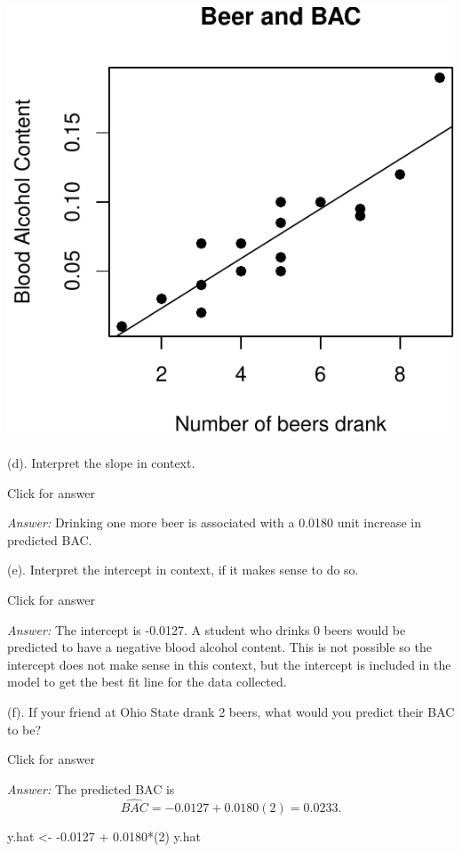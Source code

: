 \documentclass[
]{book}
\newenvironment{Shaded}{\begin{snugshade}}{\end{snugshade}}
\newcommand{\DecValTok}[1]{\textcolor[rgb]{0.00,0.00,0.81}{#1}}
\newcommand{\FloatTok}[1]{\textcolor[rgb]{0.00,0.00,0.81}{#1}}
\newcommand{\NormalTok}[1]{#1}
\newcommand{\OtherTok}[1]{\textcolor[rgb]{0.56,0.35,0.01}{#1}}
\newcommand{\SpecialCharTok}[1]{\textcolor[rgb]{0.00,0.00,0.00}{#1}}
\begin{document}
\includegraphics[width=1\linewidth]{Class_Activity_6_files/figure-latex/unnamed-chunk-6-1}

(d). Interpret the slope in context.

Click for answer

\emph{Answer:} Drinking one more beer is associated with a 0.0180 unit increase in predicted BAC.

(e). Interpret the intercept in context, if it makes sense to do so.

Click for answer

\emph{Answer:} The intercept is -0.0127. A student who drinks 0 beers would be predicted to have a negative blood alcohol content. This is not possible so the intercept does not make sense in this context, but the intercept is included in the model to get the best fit line for the data collected.

(f). If your friend at Ohio State drank 2 beers, what would you predict their BAC to be?

Click for answer

\emph{Answer:} The predicted BAC is
\[
\widehat{BAC} = -0.0127 + 0.0180(2) = 0.0233.
\]

\begin{Shaded}
\begin{Highlighting}[]
\NormalTok{y.hat }\OtherTok{\textless{}{-}} \SpecialCharTok{{-}}\FloatTok{0.0127} \SpecialCharTok{+} \FloatTok{0.0180}\SpecialCharTok{*}\NormalTok{(}\DecValTok{2}\NormalTok{) }
\NormalTok{y.hat}
\end{Highlighting}
\end{Shaded}
\end{document}
